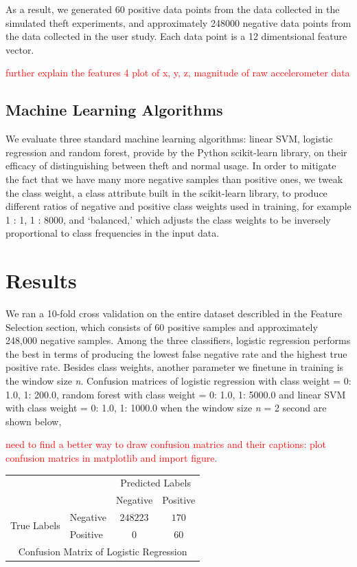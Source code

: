 \documentclass{soups}
\begin{document}
As a result, we generated 60 positive data points from the data collected in the simulated theft experiments, and approximately 248000 negative data points from the data collected in the user study. Each data point is a 12 dimentsional feature vector.

\textcolor{red}{further explain the features}
\textcolor{red}{4 plot of x, y, z, magnitude of raw accelerometer data}



\subsection{Machine Learning Algorithms}
We evaluate three standard machine learning algorithms: linear SVM, logistic regression and random forest, provide by the Python scikit-learn library, on their efficacy of distinguishing between theft and normal usage. In order to mitigate the fact that we have many more negative samples than positive ones, we tweak the class weight, a class attribute built in the scikit-learn library, to produce different ratios of negative and positive class weights used in training, for example 1 : 1, 1 : 8000, and `balanced,' which adjusts the class weights to be inversely proportional to class frequencies in the input data.



\section{Results}
We ran a 10-fold cross validation on the entire dataset describled in the Feature Selection section, which consists of 60 positive samples and approximately 248,000 negative samples. Among the three classifiers, logistic regression performs the best in terms of producing the lowest false negative rate and the highest true positive rate. Besides class weights, another parameter we finetune in training is the window size \textit{n}. Confusion matrices of logistic regression with class weight = {0: 1.0, 1: 200.0}, random forest with class weight = {0: 1.0, 1: 5000.0} and linear SVM with class weight = {0: 1.0, 1: 1000.0} when the window size \textit{n} = 2 second are shown below,

\textcolor{red}{need to find a better way to draw confusion matrics and their captions: plot confusion matrics in matplotlib and import figure.}

\begin{tabular}{l|l|c|c|}
\multicolumn{2}{c}{} &\multicolumn{2}{c}{Predicted Labels}\\
\cline{3-4}
\multicolumn{2}{c|}{}&Negative&Positive \\
\cline{2-4}
\multirow{2}{*}{True Labels}& Negative  & $248223$ & $170$ \\
\cline{2-4}
& Positive & $0$ & $60$ \\
\cline{2-4}
\multicolumn{4}{c}{Confusion Matrix of Logistic Regression} 
\end{tabular}
\end{document}
